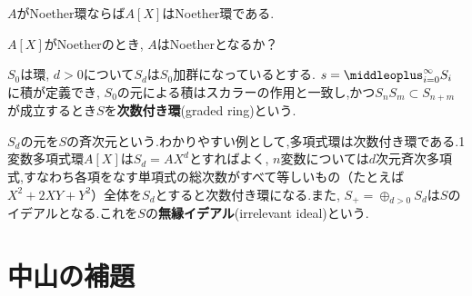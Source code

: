 \begin{cor}
	$A$がNoether環ならば$A[X]$はNoether環である.
\end{cor}

\begin{exer}
	$A[X]$がNoetherのとき, $A$はNoetherとなるか？
\end{exer}

\begin{defi}[次数付き環]
	$S_0$は環, $d>0$について$S_d$は$S_0$加群になっているとする. $s=\middleoplus_{i=0}^\infty S_i$に積が定義でき, $S_0$の元による積はスカラーの作用と一致し,かつ$S_nS_m\subset S_{n+m}$が成立するとき$S$を\textbf{次数付き環}(graded ring)という.
\end{defi}

$S_d$の元を$S$の斉次元という.わかりやすい例として,多項式環は次数付き環である.1変数多項式環$A[X]$は$S_d=AX^d$とすればよく, $n$変数については$d$次元斉次多項式,すなわち各項をなす単項式の総次数がすべて等しいもの（たとえば$X^2+2XY+Y^2$）全体を$S_d$とすると次数付き環になる.また, $S_+=\oplus_{d>0}S_d$は$S$のイデアルとなる.これを$S$の\textbf{無縁イデアル}(irrelevant ideal)という.



\section{中山の補題}


